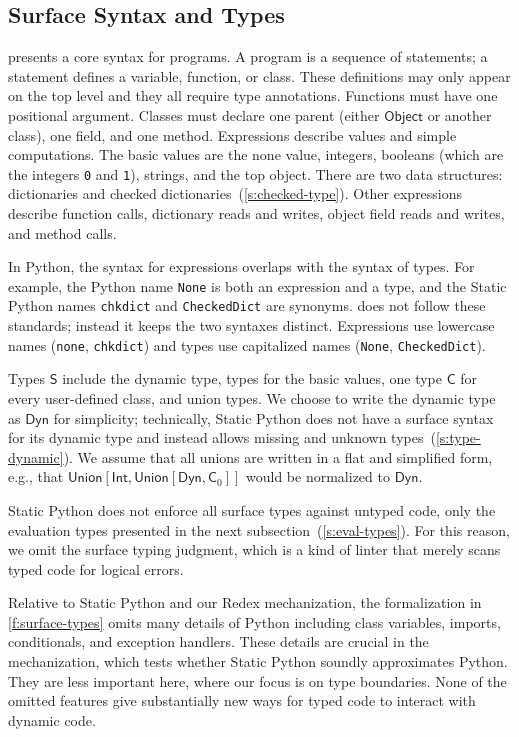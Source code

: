 \documentclass[english,cleveref,submission]{programming}
\newcommand{\SP}{Static Python}
\newcommand{\code}[1]{\texttt{#1}}
\newcommand{\typefont}[1]{\mathsf{#1}}
\newcommand{\paramtype}[2]{#1[#2]}
\newcommand{\sptype}{\typefont{S}}
\newcommand{\sptclass}{\typefont{C}}
\newcommand{\sptint}{\typefont{Int}}
\newcommand{\sptdyn}{\typefont{Dyn}}
\newcommand{\sptobject}{\typefont{Object}}
\newcommand{\sptunion}[1]{\paramtype{\typefont{Union}}{#1}}
\begin{document}
\subsection{Surface Syntax and Types}
\label{s:surface}

 presents a core syntax for programs.
A program is a sequence of statements;
a statement defines a variable, function, or class.
These definitions may only appear on the top level
and they all require type annotations.
Functions must have one positional argument.
Classes must declare one parent (either $\sptobject$ or another class), one field, and one method.
Expressions describe values and simple computations.
The basic values are the none value, integers,
booleans (which are the integers \code{0} and \code{1}), strings, and the top object.
There are two data structures: dictionaries and checked dictionaries~(\cref{s:checked-type}).
Other expressions describe function calls, dictionary reads and writes, object field reads and writes,
and method calls.

In Python, the syntax for expressions overlaps with the syntax of types.
For example, the Python name \code{None} is both an expression and a type,
and the \SP{} names \code{chkdict} and \code{CheckedDict} are synonyms.
 does not follow these standards; instead it keeps the two syntaxes distinct.
Expressions use lowercase names (\code{none}, \code{chkdict}) and types use capitalized
names (\code{None}, \code{CheckedDict}).

Types $\sptype$ include the dynamic type, types for the basic values, one type $\sptclass$ for every
user-defined class, and union types.
We choose to write the dynamic type as $\sptdyn$ for simplicity; technically,
\SP{} does not have a surface syntax for its dynamic
type and instead allows missing and unknown types~(\cref{s:type-dynamic}).
We assume that all unions are written in a flat and simplified form, e.g., that
$\sptunion{\sptint, \sptunion{\sptdyn, \sptclass_0}}$ would be normalized to $\sptdyn$.

\SP{} does not enforce all surface types against untyped code, only the evaluation
types presented in the next subsection~(\cref{s:eval-types}).
For this reason, we omit the surface typing judgment, which is a kind of linter
that merely scans typed code for logical errors.

Relative to \SP{} and our Redex mechanization, the formalization in \cref{f:surface-types} omits
many details of Python including class variables, imports, conditionals, and exception handlers.
These details are crucial in the mechanization, which tests whether \SP{}
soundly approximates Python.
They are less important here, where our focus is on type boundaries.
None of the omitted features give substantially new ways for typed code to interact with dynamic code.
\end{document}
